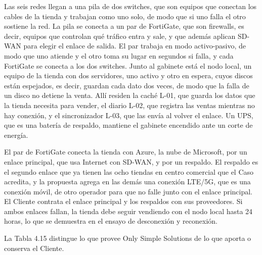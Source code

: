 \documentclass[11pt]{article}
\begin{document}
Las seis redes llegan a una pila de dos switches, que son equipos que conectan los cables de la tienda y trabajan como uno solo, de modo que si uno falla el otro sostiene la red. La pila se conecta a un par de FortiGate, que son firewalls, es decir, equipos que controlan qué tráfico entra y sale, y que además aplican SD-WAN para elegir el enlace de salida. El par trabaja en modo activo-pasivo, de modo que uno atiende y el otro toma su lugar en segundos si falla, y cada FortiGate se conecta a los dos switches. Junto al gabinete está el nodo local, un equipo de la tienda con dos servidores, uno activo y otro en espera, cuyos discos están espejados, es decir, guardan cada dato dos veces, de modo que la falla de un disco no detiene la venta. Allí residen la caché L-01, que guarda los datos que la tienda necesita para vender, el diario L-02, que registra las ventas mientras no hay conexión, y el sincronizador L-03, que las envía al volver el enlace. Un UPS, que es una batería de respaldo, mantiene el gabinete encendido ante un corte de energía.

El par de FortiGate conecta la tienda con Azure, la nube de Microsoft, por un enlace principal, que usa Internet con SD-WAN, y por un respaldo. El respaldo es el segundo enlace que ya tienen las ocho tiendas en centro comercial que el Caso acredita, y la propuesta agrega en las demás una conexión LTE/5G, que es una conexión móvil, de otro operador para que no falle junto con el enlace principal. El Cliente contrata el enlace principal y los respaldos con sus proveedores. Si ambos enlaces fallan, la tienda debe seguir vendiendo con el nodo local hasta 24 horas, lo que se demuestra en el ensayo de desconexión y reconexión.

La Tabla 4.15 distingue lo que provee Only Simple Solutions de lo que aporta o conserva el Cliente.

\par\vspace{0pt plus 10\baselineskip}\vspace{0pt plus -10\baselineskip}
\end{document}
